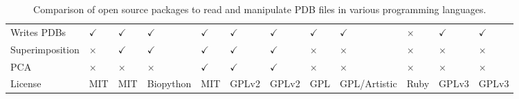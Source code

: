 \begin{table}
\begin{small}
\begin{tabular}{ llllllllllll }
Writes PDBs           & $\checkmark$ & $\checkmark$ & $\checkmark$ & $\checkmark$ & $\checkmark$ & $\checkmark$ & $\checkmark$ & $\checkmark$  & $\times$     & $\checkmark$  & $\checkmark$ \\
Superimposition       & $\times$     & $\checkmark$ & $\checkmark$ & $\checkmark$ & $\checkmark$ & $\checkmark$ & $\times$     & $\times$      & $\times$     & $\times$      & $\times$     \\
PCA                   & $\times$     & $\times$     & $\times$     & $\checkmark$ & $\checkmark$ & $\checkmark$ & $\times$     & $\times$      & $\times$     & $\times$      & $\times$     \\
License               & MIT          & MIT          & Biopython    & MIT          & GPLv2        & GPLv2        & GPL          & GPL/Artistic  & Ruby         & GPLv3         & GPLv3        \\
\hline
\end{tabular}
\end{small}

\caption{Comparison of open source packages to read and manipulate PDB files in various programming languages.}

\label{tab:package_comparison}
\end{table}


\begin{figure}
\centering


\caption{}

\label{fig:pdb_benchmarks}
\end{figure}
